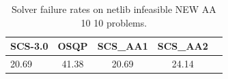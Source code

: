 \begin{table}
\centering
\caption{Solver failure rates on netlib infeasible NEW AA 10 10 problems.}
\label{t-netlib infeasible NEW AA 10 10-failure}
\begin{tabular}{lcccc}
\toprule
 SCS-3.0 &  OSQP &  SCS\_AA1 &  SCS\_AA2 \\
\midrule
   20.69 & 41.38 &    20.69 &    24.14 \\
\bottomrule
\end{tabular}
\end{table}

